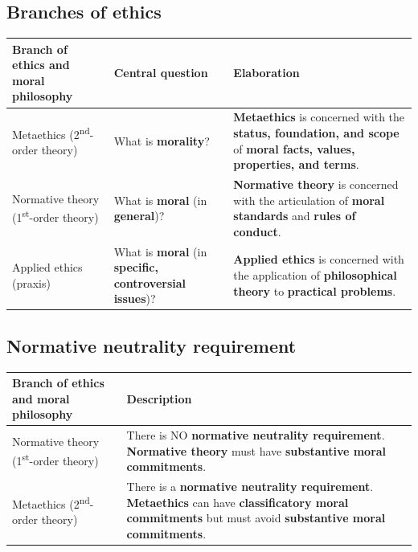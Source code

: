 \documentclass[11pt]{article}
\begin{document}
\subsection{Branches of ethics}
\label{sec:orga460a25}
\begin{center}
\begin{tabularx}{\textwidth}{|X|X|X|}
\hline
Branch of ethics and moral philosophy & Central question & Elaboration\\
\hline
Metaethics (2\textsuperscript{nd}-order theory) & What is \textbf{morality}? & \textbf{Metaethics} is concerned with the \textbf{status, foundation, and scope} of \textbf{moral facts, values, properties, and terms}.\\
\hline
Normative theory (1\textsuperscript{st}-order theory) & What is \textbf{moral} (in \textbf{general})? & \textbf{Normative theory} is concerned with the articulation of \textbf{moral standards} and \textbf{rules of conduct}.\\
\hline
Applied ethics (praxis) & What is \textbf{moral} (in \textbf{specific, controversial issues})? & \textbf{Applied ethics} is concerned with the application of \textbf{philosophical theory} to \textbf{practical problems}.\\
\hline
\end{tabularx}
\end{center}
\subsection{Normative neutrality requirement}
\label{sec:org0b4ad34}
\begin{center}
\begin{tabularx}{\textwidth}{|X|X|}
\hline
Branch of ethics and moral philosophy & Description\\
\hline
Normative theory (1\textsuperscript{st}-order theory) & There is NO \textbf{normative neutrality requirement}. \textbf{Normative theory} must have \textbf{substantive moral commitments}.\\
\hline
Metaethics (2\textsuperscript{nd}-order theory) & There is a \textbf{normative neutrality requirement}. \textbf{Metaethics} can have \textbf{classificatory moral commitments} but must avoid \textbf{substantive moral commitments}.\\
\hline
\end{tabularx}
\end{center}
 \newpage
\end{document}
